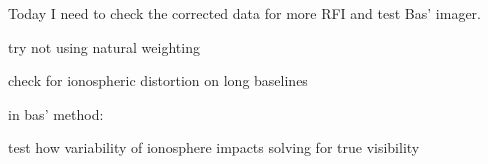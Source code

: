 \documentclass[12pt]{article}
\begin{document}
Today I need to check the corrected data for more RFI and test Bas'
imager.

try not using natural weighting

check for ionospheric distortion on long baselines

in bas' method:

test how variability of ionosphere impacts solving for true visibility
\end{document}
